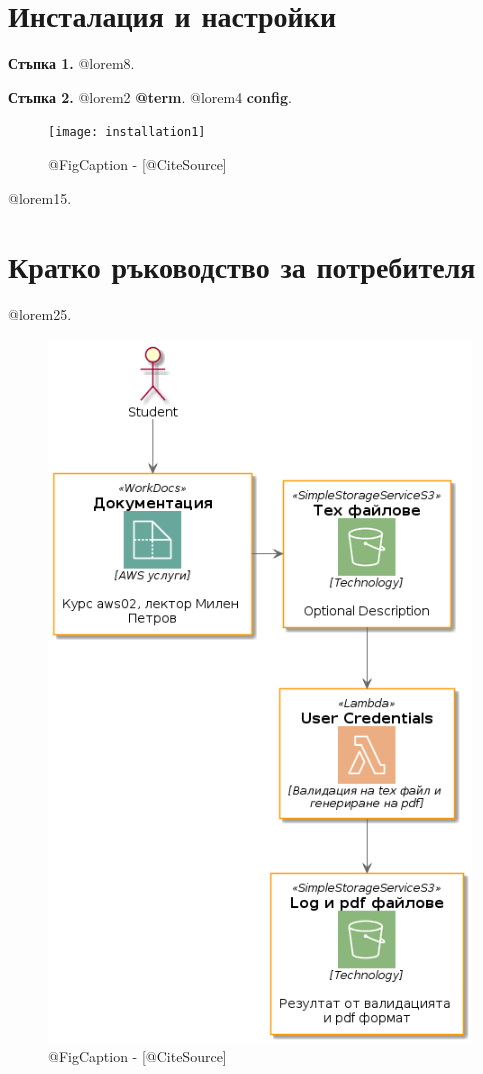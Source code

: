 \documentclass[12pt]{article}
\begin{document}

\section{Инсталация и настройки}
\noindent\textbf{Стъпка 1.} @lorem8.

\medskip

\noindent\textbf{Стъпка 2.} @lorem2 \textbf{@term}. @lorem4 \textbf{config}.

\begin{figure}[h!]
\centering
  \texttt{[image: installation1]}
  \caption{@FigCaption - [@CiteSource]}
\end{figure}


\noindent @lorem15.

\medskip

\section{Кратко ръководство за потребителя}

@lorem25.

\begin{figure}[h!]
\centering
    \includegraphics[scale=0.4]{9999_fig1.png}
  \caption{@FigCaption - [@CiteSource]}
\end{figure}
\end{document}
